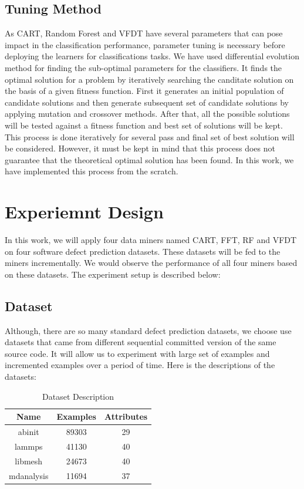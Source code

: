 \documentclass[sigplan]{acmart}\settopmatter{printfolios=true,printccs=false,printacmref=false}
\begin{document}
\subsection{Tuning Method}
As CART, Random Forest and VFDT have several parameters that can pose impact in the classification performance, parameter tuning is necessary before deploying the learners for classifications tasks. We have used differential evolution method for finding the sub-optimal parameters for the classifiers. It finds the optimal solution for a problem by iteratively searching the canditate solution on the basis of a given fitness function. First it generates an initial population of candidate solutions and then generate subsequent set of candidate solutions by applying mutation and crossover methods. After that, all the possible solutions will be tested against a fitness function and best set of solutions will be kept. This process is done iteratively for several pass and final set of best solution will be considered. However, it must be kept in mind that this process does not guarantee that the theoretical optimal solution has been found. In this work, we have implemented this process from the scratch. 


\section{Experiemnt Design}
In this work, we will apply four data miners named CART, FFT, RF and VFDT on four software defect prediction datasets. These datasets will be fed to the miners incrementally. We would observe the performance of all four miners based on these datasets. The experiment setup is described below:

\subsection{Dataset}
Although, there are so many standard defect prediction datasets, we choose use datasets that came from different sequential committed version of the same source code. It will allow us to experiment with large set of examples and incremented examples over a period of time. Here is the descriptions of the datasets:

\begin{center}
	\begin{table}[h]
			\begin{tabular}{|c|c|c|}
			\hline 
			\textbf{Name} & \textbf{Examples} & \textbf{Attributes} \\ 
			\hline 
			abinit & 89303 & 29 \\ 
			\hline 
			lammps & 41130 & 40 \\ 
			\hline 
			libmesh & 24673 & 40 \\ 
			\hline 
			mdanalysis & 11694 & 37 \\ 
			\hline
		\end{tabular}   
	\caption{Dataset Description}
	\label{tab:dataset}
	\end{table}
\end{center}
\end{document}
